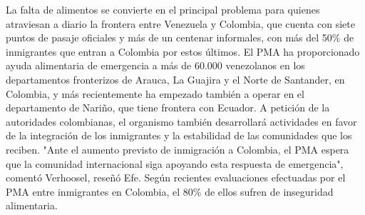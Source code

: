 \documentclass{article}%
\begin{document}
\newline%
%
La falta de alimentos se convierte en el principal problema para quienes atraviesan a diario la frontera entre Venezuela y Colombia, que cuenta con siete puntos de pasaje oficiales y más de un centenar informales, con más del 50\% de inmigrantes que entran a Colombia por estos últimos.%
\newline%
%
El PMA ha proporcionado ayuda alimentaria de emergencia a más de 60.000 venezolanos en los departamentos fronterizos de Arauca, La Guajira y el Norte de Santander, en Colombia, y más recientemente ha empezado también a operar en el departamento de Nariño, que tiene frontera con Ecuador.%
\newline%
%
A petición de la autoridades colombianas, el organismo también desarrollará actividades en favor de la integración de los inmigrantes y la estabilidad de las comunidades que los reciben.%
\newline%
%
"Ante el aumento previsto de inmigración a Colombia, el PMA espera que la comunidad internacional siga apoyando esta respuesta de emergencia", comentó Verhoosel, reseñó Efe.%
\newline%
%
Según recientes evaluaciones efectuadas por el PMA entre inmigrantes en Colombia, el 80\% de ellos sufren de inseguridad alimentaria.%
\newline%
%
\end{document}
